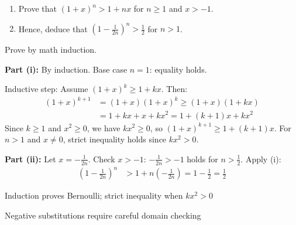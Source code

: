 \begin{problem}
\begin{enumerate}
    \item[(i)] Prove that $(1+x)^n > 1+nx$ for $n \ge 1$ and $x > -1$.
    \item[(ii)] Hence, deduce that $\left(1 - \frac{1}{2n}\right)^n > \frac{1}{2}$ for $n > 1$.
\end{enumerate}
\end{problem}

\begin{hint}
Prove by math induction.
\end{hint}

\begin{solution}
\textbf{Part (i):} By induction. Base case $n=1$: equality holds.

Inductive step: Assume $(1+x)^k \ge 1+kx$. Then:
\begin{align*}
(1+x)^{k+1} &= (1+x)(1+x)^k \ge (1+x)(1+kx)\\
&= 1 + kx + x + kx^2 = 1 + (k+1)x + kx^2
\end{align*}
Since $k \ge 1$ and $x^2 \ge 0$, we have $kx^2 \ge 0$, so $(1+x)^{k+1} \ge 1+(k+1)x$.
For $n > 1$ and $x \neq 0$, strict inequality holds since $kx^2 > 0$.

\textbf{Part (ii):} Let $x = -\frac{1}{2n}$. Check $x > -1$: $-\frac{1}{2n} > -1$ holds for $n > \frac{1}{2}$.
Apply (i):
\begin{align*}
\left(1 - \frac{1}{2n}\right)^n &> 1 + n\left(-\frac{1}{2n}\right) = 1 - \frac{1}{2} = \frac{1}{2}
\end{align*}
\end{solution}

\begin{takeaways}
\item Induction proves Bernoulli; strict inequality when $kx^2 > 0$
\item Negative substitutions require careful domain checking
\end{takeaways}
